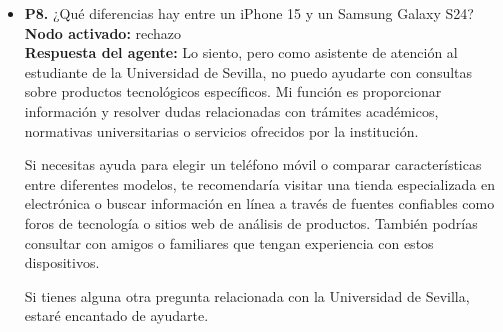 \documentclass{article}
\begin{document}
\begin{itemize}
            ¿Hay algo más en lo que pueda ayudarte relacionado con la Universidad?

      \item \textbf{P8.} ¿Qué diferencias hay entre un iPhone 15 y un Samsung Galaxy S24? \\
            \textbf{Nodo activado:} rechazo \\
            \textbf{Respuesta del agente:} Lo siento, pero como asistente de atención al estudiante de la Universidad de Sevilla, no puedo ayudarte con consultas sobre productos tecnológicos específicos. Mi función es proporcionar información y resolver dudas relacionadas con trámites académicos, normativas universitarias o servicios ofrecidos por la institución.

            Si necesitas ayuda para elegir un teléfono móvil o comparar características entre diferentes modelos, te recomendaría visitar una tienda especializada en electrónica o buscar información en línea a través de fuentes confiables como foros de tecnología o sitios web de análisis de productos. También podrías consultar con amigos o familiares que tengan experiencia con estos dispositivos.

            Si tienes alguna otra pregunta relacionada con la Universidad de Sevilla, estaré encantado de ayudarte.

\end{itemize}
\end{document}
